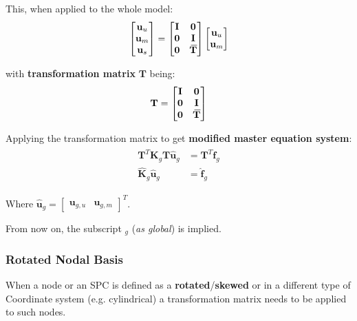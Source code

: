 \documentclass[10pt,b5paper,titlepage]{book}
\newcommand{\m}{\mathbf}
\newcommand{\closure}[2][3]{%
{}\mkern#1mu\overline{\mkern-#1mu#2}}
\newenvironment{eqarray}
{
    \begin{eqnarray}
        \begin{aligned}
}
{
        \end{aligned}
    \end{eqnarray}
}
\begin{document}
This, when applied to the whole model:
\begin{equation}
    \begin{bmatrix}
        \m{u}_u  \\
        \m{u}_m \\
        \m{u}_s \\
    \end{bmatrix}
    = \begin{bmatrix}
        \m{I} & \m{0} \\
        \m{0} & \m{I} \\
        \m{0} & \m{\closure{T}} \\
    \end{bmatrix}
    \begin{bmatrix}
        \m{u}_u \\
        \m{u}_m \\
    \end{bmatrix}
\end{equation}

with \textbf{transformation matrix} $ \m{T} $ being:
\begin{equation}
    \m{T} = \begin{bmatrix}
        \m{I} & \m{0} \\
        \m{0} & \m{I} \\
        \m{0} & \m{\closure{T}} \\
    \end{bmatrix}
\end{equation}

Applying the transformation matrix to get \textbf{modified master equation system}:
\begin{eqarray}
    \m{T}^T \m{K}_g \m{T} \m{\hat{u}}_g &= \m{T}^T \m{f}_g \\
    \m{\hat{K}}_g \m{\hat{u}}_g &= \m{\hat{f}}_g
\end{eqarray}

Where $ \m{\hat{u}}_g = \begin{bmatrix} \m{u}_{g,u} & \m{u}_{g,m} \end{bmatrix}^T $.

From now on, the subscript $ _g $ (\textit{as global}) is implied.


\subsubsection{Rotated Nodal Basis}

When a node or an SPC is defined as a \textbf{rotated}/\textbf{skewed} or in
a different type of Coordinate system (e.g. cylindrical) a transformation matrix
needs to be applied to such nodes.
\end{document}
